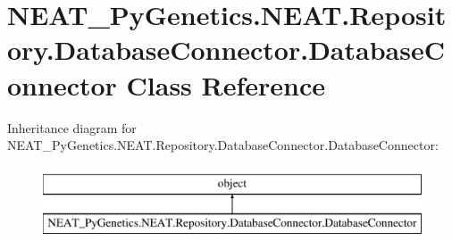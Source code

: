 \hypertarget{class_n_e_a_t___py_genetics_1_1_n_e_a_t_1_1_repository_1_1_database_connector_1_1_database_connector}{}\section{N\+E\+A\+T\+\_\+\+Py\+Genetics.\+N\+E\+A\+T.\+Repository.\+Database\+Connector.\+Database\+Connector Class Reference}
\label{class_n_e_a_t___py_genetics_1_1_n_e_a_t_1_1_repository_1_1_database_connector_1_1_database_connector}
Inheritance diagram for N\+E\+A\+T\+\_\+\+Py\+Genetics.\+N\+E\+A\+T.\+Repository.\+Database\+Connector.\+Database\+Connector\+:\begin{figure}[H]
\begin{center}
\leavevmode
\includegraphics[height=2.000000cm]{class_n_e_a_t___py_genetics_1_1_n_e_a_t_1_1_repository_1_1_database_connector_1_1_database_connector}
\end{center}
\end{figure}
